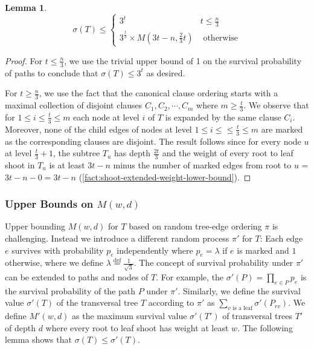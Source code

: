 \documentclass[10pt,a4paper]{article}
\newcommand{\eqdef}{\stackrel{\textrm{def}}{=}}
\newtheorem{lemma}{Lemma}
\newcommand{\total}{\sigma}
\begin{document}
\begin{lemma}
\label{pess-ntran}
\[
\total(T) \le
\begin{cases}
3^t & t \le \frac{n}{3}\\
3^{\frac{t}{3}}\times M(3t - n, \frac{2}{3}t) & \textrm{ otherwise}
\end{cases}
\]
\end{lemma}

\begin{proof}
For $t\le \frac{n}{3}$, we use the trivial upper 
bound of 1 on the survival probability of paths
to conclude that $\total(T) \le 3^t$ as desired.

For $t \ge \frac{n}{3}$, we use the fact that the canonical clause
ordering starts with a maximal collection of disjoint clauses $C_1, C_2, \cdots, C_m$
where  $m\geq \frac{t}{3}$.
We observe that for $1\leq i\leq \frac{t}{3}\leq m$ 
each node at level $i$ of $T$ is expanded by the same
clause $C_i$.
Moreover, none of  the child edges  of nodes at level $1\leq i\leq \le \frac{t}{3}\leq m$ are marked
as the corresponding clauses are disjoint.
The result follows since
for every node $u$ at level $\frac{t}{3} + 1$, the subtree $T_u$ has depth $\frac{2t}{3}$ and
the weight of
every root to leaf shoot in $T_u$
is at least $3t - n$ minus the number of marked edges from root to $u$ = $3t - n - 0 = 3t - n$ 
(\cref{fact:shoot-extended-weight-lower-bound}).
\end{proof}

\subsubsection{Upper Bounds on $M(w,d)$}
Upper bounding $M(w,d)$ for $T$ based on random tree-edge ordering $\pi$
is challenging. 
Instead we introduce a different
random process $\pi'$ for $T$: Each edge $e$ survives with probability $p_e$ independently
where $p_e = \lambda$ if $e$ is marked and $1$ otherwise,
where we define 
$\lambda \eqdef \frac{1}{\sqrt{3}}$.
The concept of survival probability under $\pi'$
can be extended to paths and nodes of $T$.
For example, the $\sigma'(P) = \prod_{e\in P} p_e$ is the survival probability
of the path $P$ under $\pi'$. 
Similarly, we define the survival value $\total'(T)$ of the transversal tree $T$ according to $\pi'$ as $\sum_{v\text{ is a leaf}} \sigma'(P_{rv})$. 
We define $M'(w,d)$ as the maximum survival value $\total'(T')$ of transversal trees $T'$
of depth $d$ where every root to leaf shoot has weight at least $w$.
The following lemma shows that $\total(T)\leq \total'(T)$.
\end{document}

